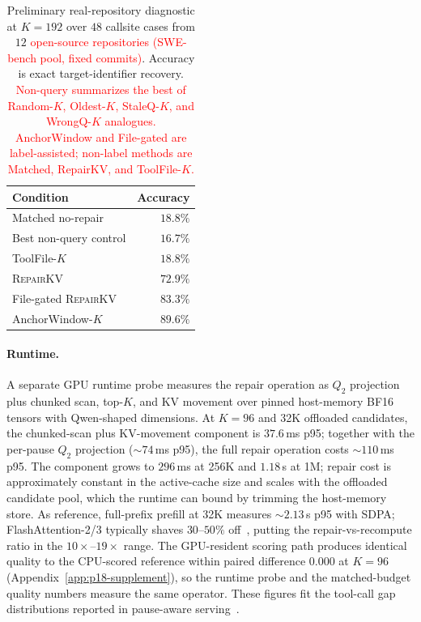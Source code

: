 \documentclass{article}
\newcommand{\repairkv}{\textsc{RepairKV}}
\begin{document}
\begin{table}[b]
  \centering
  \setlength{\tabcolsep}{5pt}
  \caption{Preliminary real-repository diagnostic at $K=192$ over $48$
  callsite cases from $12$ \textcolor{red}{open-source repositories
  (SWE-bench pool, fixed commits)}. Accuracy is
  exact target-identifier recovery. \textcolor{red}{Non-query summarizes the
  best of Random-$K$, Oldest-$K$, StaleQ-$K$, and WrongQ-$K$ analogues.} \textcolor{red}{AnchorWindow
  and File-gated are label-assisted; non-label methods are Matched,
  RepairKV, and ToolFile-$K$.}}
  \label{tab:real-repo-diagnostic}
  \begin{tabular}{@{}lr@{}}
    \toprule
    Condition & Accuracy \\
    \midrule
    Matched no-repair & $18.8\%$ \\
    Best non-query control & $16.7\%$ \\
    ToolFile-$K$ & $18.8\%$ \\
    \repairkv{} & $72.9\%$ \\
    File-gated \repairkv{} & $83.3\%$ \\
    AnchorWindow-$K$ & $89.6\%$ \\
    \bottomrule
  \end{tabular}
\end{table}

\paragraph{\textcolor{green!50!black}{Runtime.}}
\textcolor{green!50!black}{A separate GPU runtime probe measures the repair operation as $Q_2$ projection plus chunked scan, top-$K$, and KV movement over pinned host-memory BF16 tensors with Qwen-shaped dimensions. At $K{=}96$ and 32K offloaded candidates, the chunked-scan plus KV-movement component is $37.6$\,ms p95; together with the per-pause $Q_2$ projection (${\sim}74$\,ms p95), the full repair operation costs ${\sim}110$\,ms p95. The component grows to $296$\,ms at 256K and $1.18$\,s at 1M; repair cost is approximately constant in the active-cache size and scales with the offloaded candidate pool, which the runtime can bound by trimming the host-memory store. As reference, full-prefix prefill at 32K measures ${\sim}2.13$\,s p95 with SDPA; FlashAttention-2/3 typically shaves $30$--$50\%$ off~\citep{flashattn2,flashattn3}, putting the repair-vs-recompute ratio in the $10\times$--$19\times$ range. The GPU-resident scoring path produces identical quality to the CPU-scored reference within paired difference $0.000$ at $K{=}96$ (Appendix~\ref{app:p18-supplement}), so the runtime probe and the matched-budget quality numbers measure the same operator. These figures fit the tool-call gap distributions reported in pause-aware serving~\citep{continuum}.}
\end{document}
